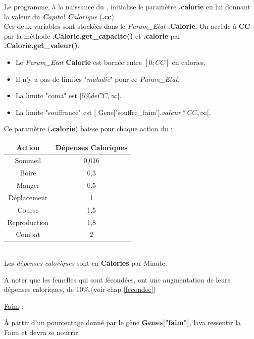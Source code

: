 \documentclass[french]{report}
\newlength{\du}\fi
\begin{document}
Le programme, à la naissance du \CoCiX, initialise le paramètre \textbf{.calorie} en lui donnant la valeur du \textit{\textbf{C}apital \textbf{C}alorique} (\textbf{.cc})\\

Ces deux variables sont stockées dans le\textit{ Param\_Etat} \textbf{.Calorie}. On accède à \textbf{CC} par la méthode \textbf{.Calorie.get\_capacite()} et \textbf{.calorie} par \textbf{.Calorie.get\_valeur()}.\\
\begin{itemize}
	\item Le \textit{Param\_Etat} \textbf{Calorie} est bornée entre $[0;CC]$ en calories.\\
	\item Il n'y a pas de limites "\textit{maladie}" pour ce \textit{Param\_Etat}.\\
	\item La limite "coma" est $[5\% de CC ,\infty [$.\\
	\item La limite "souffrance" est [ Gene['souffre\_faim'].$valeur * CC , \infty [$.\\
\end{itemize}



Ce paramètre (\textbf{.calorie}) baisse pour chaque action du \CoCiX  :\\

\begin{center}\label{depense_calorique}
\begin{tabular}{|c|c|}\hline
\rowcolor{yellow}\textbf{Action} & \textbf{Dépenses Caloriques}\\ \hline
Sommeil & 0,016 \\ \hline
Boire & 0,3 \\ \hline
Manger  & 0,5 \\ \hline
Déplacement & 1 \\ \hline
Course & 1,5 \\ \hline
Reproduction & 1,8 \\ \hline
Combat & 2 \\ \hline
\end{tabular}\\[0.5cm]

Les \textit{dépenses caloriques} sont en \textbf{Calories} par Minute.

\end{center}

A noter que les femelles qui sont fécondées, ont une augmentation de leurs dépenses caloriques, de 10\%.(voir chap \ref{fecondee})\\
\begin{center}
	\underline{Faim} :\label{faim}
\end{center}
À partir d'un pourcentage donné par le gène \textbf{Genes["faim"]}, la\CoCiX va  ressentir la Faim et devra se nourrir.\\
\end{document}
